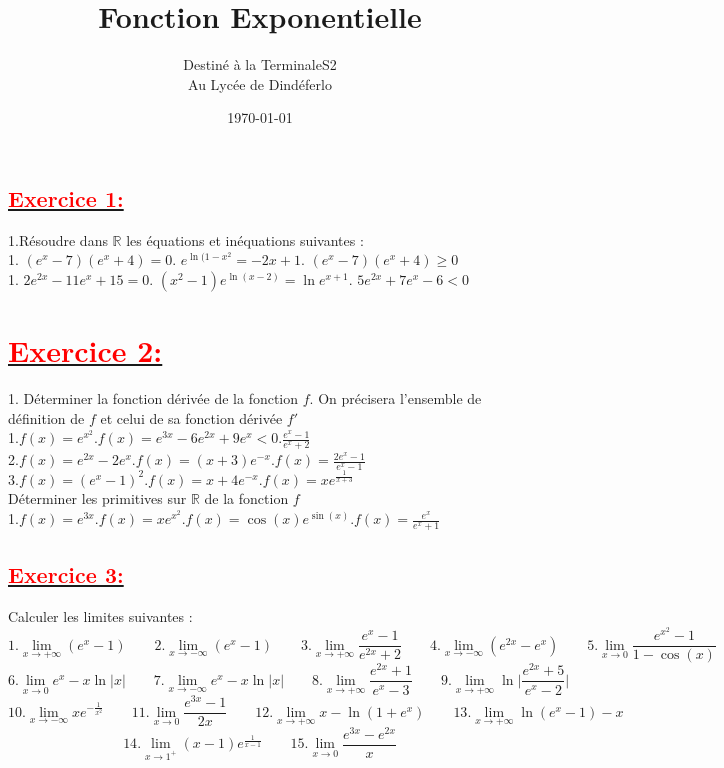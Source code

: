 \documentclass[12pt]{article}
\author{Destiné à la TerminaleS2\\Au Lycée de Dindéferlo}
\title{\textbf{Fonction Exponentielle}}
\date{\today}
\begin{document}
\maketitle
\newpage
\subsection*{\underline{\textbf{\textcolor{red}{Exercice 1:}}}}
1.Résoudre dans $\mathbb{R}$ les équations et inéquations suivantes :\\
1. $(e^{x}-7)(e^{x}+4)=0$\quad{}. $e^{\ln(1-x^{2}}=-2x+1$\quad{}. $(e^{x}-7)(e^{x}+4)\geq 0$\\
1. $2e^{2x}-11e^{x}+15=0$\quad{}. $(x^{2}-1)e^{\ln(x-2)}={\ln}e^{x+1}$\quad{}. $5e^{2x}+7e^{x}-6<0$\\
\section*{\underline{\textbf{\textcolor{red}{Exercice 2:}}}}
1. Déterminer la fonction dérivée de la fonction $f$. On précisera l’ensemble de définition de $f$ et celui de sa fonction dérivée $f'$\\
1.$f(x)=e^{x^{2}}$\quad\quad{}.$f(x)=e^{3x}-6e^{2x}+9e^{x}<0$\quad\quad{}.$\frac{e^{x}-1}{e^{x}+2}$\\
2.$f(x)=e^{2x}-2e^{x}$\quad\quad{}.$f(x)=(x+3)e^{-x}$\quad\quad{}.$f(x)=\frac{2e^{x}-1}{e^{x}-1}$\\
3.$f(x)=(e^{x}-1)^{2}$\quad\quad{}.$f(x)=x+4e^{-x}$\quad\quad{}.$f(x)=xe^{\frac{1}{x+3}}$\\
Déterminer les primitives sur $\mathbb{R}$ de la fonction $f$\\
1.$f(x)=e^{3x}$\quad{}.$f(x)=xe^{x^{2}}$\quad{}.\(f(x)=\cos(x)e^{{\sin(x)}}\).$f(x)=\frac{e^{x}}{e^{x}+1}$
\subsection*{\underline{\textbf{\textcolor{red}{Exercice 3:}}}}
Calculer les limites suivantes :\\
\[1.\lim_{x \to +\infty}(e^{x}-1)\quad\quad 2.\lim_{x \to -\infty}(e^{x}-1)\quad\quad  3.\lim_{x \to +\infty}\frac{e^{x}-1}{e^{2x}+2}\quad\quad 4.\lim_{x \to -\infty}(e^{2x}-e^{x}) \quad\quad 5. \lim_{x \to 0}\frac{e^{x^{2}}-1}{1-\cos(x)}\]
\[6.\lim_{x \to 0} e^{x}-x\ln|x|\quad\quad 7.\lim_{x \to -\infty} e^{x}-x\ln|x| 
\quad\quad 8.\lim_{x \to +\infty}\frac{e^{2x}+1}{e^{x}-3}\quad\quad
9.\lim_{x \to +\infty}\ln\vert\frac{e^{2x}+5}{e^{x}-2}\vert\]
\[10.\lim_{x \to -\infty}{xe^{-\frac{1}{x^{2}}}}\quad\quad
11.\lim_{x \to 0}\frac{{e^{3x}-1}}{2x}\quad\quad 12.\lim_{x \to +\infty} x-\ln(1+e^{x})\quad\quad 13.\lim_{x \to +\infty} \ln(e^{x}-1)-x\]
\[14.\lim_{x \to 1^{+}}(x-1)e^{\frac{1}{x-1}}\quad\quad 
15.\lim_{x \to 0}\frac{e^{3x}-e^{2x}}{x}\]
\end{document}

